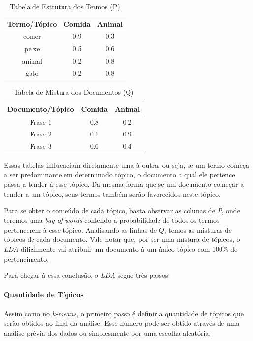 \begin{table}[h]
\centering
\begin{tabular}{|c|c|c|}
\hline
\textbf{Termo/Tópico} & \textbf{Comida} & \textbf{Animal} \\ \hline
comer & 0.9 & 0.3 \\ \hline
peixe & 0.5 & 0.6 \\ \hline
animal & 0.2 & 0.8 \\ \hline
gato & 0.2 & 0.8 \\ \hline
\end{tabular}
\caption{Tabela de Estrutura dos Termos (P)}
\label{tabelap}
\end{table}

\begin{table}[h]
\centering
\begin{tabular}{|c|c|c|}
\hline
\textbf{Documento/Tópico} & \textbf{Comida} & \textbf{Animal} \\ \hline
Frase 1 & 0.8 & 0.2 \\ \hline
Frase 2 & 0.1 & 0.9 \\ \hline
Frase 3 & 0.6 & 0.4 \\ \hline
\end{tabular}
\caption{Tabela de Mistura dos Documentos (Q)}
\label{tabelaq}
\end{table}

Essas tabelas influenciam diretamente uma à outra, ou seja, se um termo começa a ser predominante em determinado tópico, o documento a qual ele pertence passa a tender à esse tópico. Da mesma forma que se um documento começar a tender a um tópico, seus termos também serão favorecidos neste tópico.

Para se obter o conteúdo de cada tópico, basta observar as colunas de \(P\), onde teremos uma \textit{bag of words} contendo a probabilidade de todos os termos pertencerem à esse tópico. Analisando as linhas de \(Q\), temos as misturas de tópicos de cada documento. Vale notar que, por ser uma mistura de tópicos, o \textit{LDA} dificilmente vai atribuir um documento à um único tópico com 100\% de pertencimento.

Para chegar à essa conclusão, o \textit{LDA} segue três passos:

\paragraph{Quantidade de Tópicos}
Assim como no \textit{k-means}, o primeiro passo é definir a quantidade de tópicos que serão obtidos ao final da análise. Esse número pode ser obtido através de uma análise prévia dos dados ou simplesmente por uma escolha aleatória.

